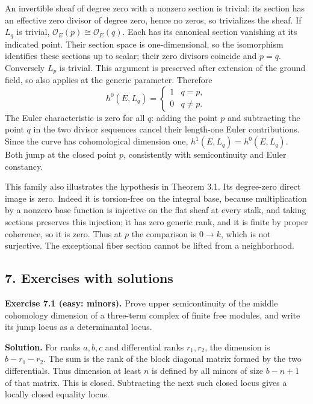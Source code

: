 \documentclass[11pt]{article}
\begin{document}
An invertible sheaf of degree zero with a nonzero section is trivial:
its section has an effective zero divisor of degree zero, hence no
zeros, so trivializes the sheaf. If \(L_q\) is trivial,
\(\mathcal O_E(p)\cong\mathcal O_E(q)\). Each has its canonical section
vanishing at its indicated point. Their section space is
one-dimensional, so the isomorphism identifies these sections up to
scalar; their zero divisors coincide and \(p=q\). Conversely \(L_p\) is
trivial. This argument is preserved after extension of the ground field,
so also applies at the generic parameter. Therefore \[
h^0(E,L_q)=\begin{cases}1&q=p,\\0&q\ne p.\end{cases}
\] The Euler characteristic is zero for all \(q\): adding the point
\(p\) and subtracting the point \(q\) in the two divisor sequences
cancel their length-one Euler contributions. Since the curve has
cohomological dimension one, \(h^1(E,L_q)=h^0(E,L_q)\). Both jump at the
closed point \(p\), consistently with semicontinuity and Euler
constancy.

This family also illustrates the hypothesis in Theorem 3.1. Its
degree-zero direct image is zero. Indeed it is torsion-free on the
integral base, because multiplication by a nonzero base function is
injective on the flat sheaf at every stalk, and taking sections
preserves this injection; it has zero generic rank, and it is finite by
proper coherence, so it is zero. Thus at \(p\) the comparison is
\(0\to k\), which is not surjective. The exceptional fiber section
cannot be lifted from a neighborhood.

\subsection{7. Exercises with
solutions}\label{exercises-with-solutions-8}

\textbf{Exercise 7.1 (easy: minors).} Prove upper semicontinuity of the
middle cohomology dimension of a three-term complex of finite free
modules, and write its jump locus as a determinantal locus.

\textbf{Solution.} For ranks \(a,b,c\) and differential ranks
\(r_1,r_2\), the dimension is \(b-r_1-r_2\). The sum is the rank of the
block diagonal matrix formed by the two differentials. Thus dimension at
least \(n\) is defined by all minors of size \(b-n+1\) of that matrix.
This is closed. Subtracting the next such closed locus gives a locally
closed equality locus.
\end{document}
